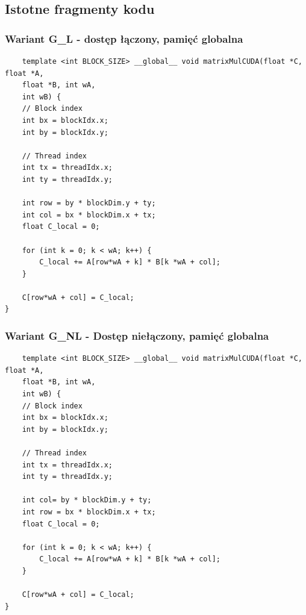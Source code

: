 \documentclass[10pt,a4paper]{article}
\begin{document}
\newpage

\subsection{Istotne fragmenty kodu}
\subsubsection*{Wariant G\_L - dostęp łączony, pamięć globalna}
\begin{lstlisting}
	template <int BLOCK_SIZE> __global__ void matrixMulCUDA(float *C, float *A,
	float *B, int wA,
	int wB) {
	// Block index
	int bx = blockIdx.x;
	int by = blockIdx.y;

	// Thread index
	int tx = threadIdx.x;
	int ty = threadIdx.y;

	int row = by * blockDim.y + ty;
	int col = bx * blockDim.x + tx;
	float C_local = 0;

	for (int k = 0; k < wA; k++) {
		C_local += A[row*wA + k] * B[k *wA + col];
	}

	C[row*wA + col] = C_local;
}
\end{lstlisting}

\subsubsection*{Wariant G\_NL - Dostęp niełączony, pamięć globalna}
\begin{lstlisting}
	template <int BLOCK_SIZE> __global__ void matrixMulCUDA(float *C, float *A,
	float *B, int wA,
	int wB) {
	// Block index
	int bx = blockIdx.x;
	int by = blockIdx.y;

	// Thread index
	int tx = threadIdx.x;
	int ty = threadIdx.y;

	int col= by * blockDim.y + ty;
	int row = bx * blockDim.x + tx;
	float C_local = 0;

	for (int k = 0; k < wA; k++) {
		C_local += A[row*wA + k] * B[k *wA + col];
	}

	C[row*wA + col] = C_local;
}
\end{lstlisting}
\end{document}
